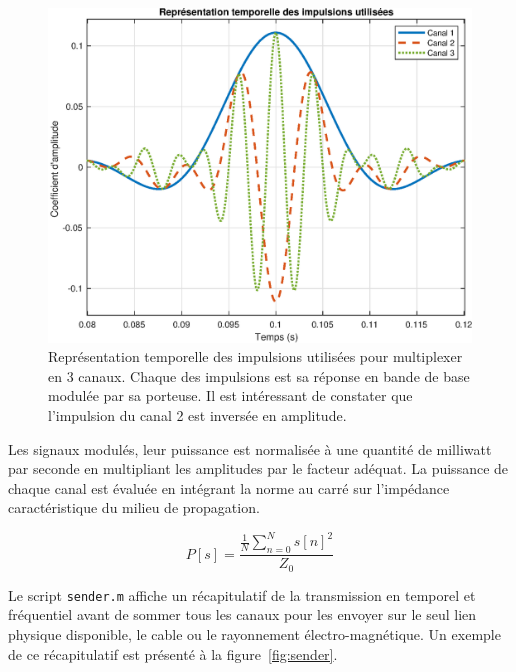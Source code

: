 \documentclass[10pt, oneside, a4paper]{article}
\begin{document}
\begin{figure}[p]
	\centering
	\includegraphics[height=0.4\textheight]{eps/impulse.eps}
	\caption{Représentation temporelle des impulsions utilisées pour multiplexer en 3 canaux.
			 Chaque des impulsions est sa réponse en bande de base modulée par sa porteuse.
			 Il est intéressant de constater que l'impulsion du canal 2 est inversée en
			 amplitude.}
	\label{fig:impulse}
\end{figure}

Les signaux modulés, leur puissance est normalisée à une quantité de milliwatt par seconde en multipliant les amplitudes par le facteur adéquat.
La puissance de chaque canal est évaluée en intégrant la norme au carré sur l'impédance caractéristique du milieu de propagation.

\begin{equation}
	P[s] = \frac{\frac{1}{N} \sum_{n = 0}^{N} s[n]^2}{Z_0}
\end{equation}

Le script \texttt{sender.m} affiche un récapitulatif de la transmission en temporel et fréquentiel avant de sommer tous les canaux pour les envoyer sur le seul lien physique disponible, le cable ou le rayonnement électro-magnétique.
Un exemple de ce récapitulatif est présenté à la figure~\ref{fig:sender}.
\end{document}
